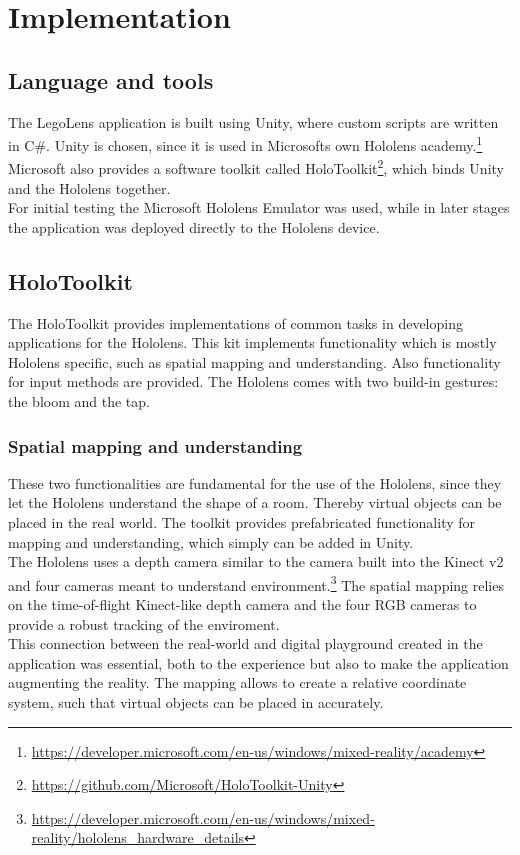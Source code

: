 \section{Implementation}

\subsection{Language and tools}
The LegoLens application is built using Unity, where custom scripts are written in C\#. Unity is chosen, since it is used in Microsofts own Hololens academy.\footnote{\url{https://developer.microsoft.com/en-us/windows/mixed-reality/academy}} Microsoft also provides a software toolkit called HoloToolkit\footnote{\url{https://github.com/Microsoft/HoloToolkit-Unity}}, which binds Unity and the Hololens together. \\
For initial testing the Microsoft Hololens Emulator was used, while in later stages the application was deployed directly to the Hololens device. 

\subsection{HoloToolkit}
The HoloToolkit provides implementations of common tasks in developing applications for the Hololens. This kit implements functionality which is mostly Hololens specific, such as spatial mapping and understanding. Also functionality for input methods are provided. The Hololens comes with two build-in gestures: the bloom and the tap.

\subsubsection{Spatial mapping and understanding}
These two functionalities are fundamental for the use of the Hololens, since they let the Hololens understand the shape of a room. Thereby virtual objects can be placed in the real world. The toolkit provides prefabricated functionality for mapping and understanding, which simply can be added in Unity.  \\
The Hololens uses a depth camera similar to the camera built into the Kinect v2 and four cameras meant to understand environment.\footnote{\url{https://developer.microsoft.com/en-us/windows/mixed-reality/hololens_hardware_details}} The spatial mapping relies on the time-of-flight Kinect-like depth camera and the four RGB cameras to provide a robust tracking of the enviroment. \\
This connection between the real-world and digital playground created in the application was essential, both to the experience but also to make the application augmenting the reality. The mapping allows to create a relative coordinate system, such that virtual objects can be placed in accurately.


